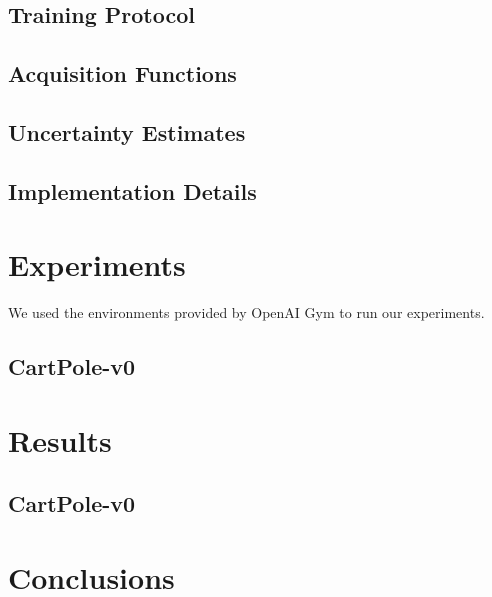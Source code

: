 \documentclass[11pt, a4paper, bibliography=totoc]{report}
\begin{document}
\section{Training Protocol}

\section{Acquisition Functions}

\section{Uncertainty Estimates}

\section{Implementation Details}

\chapter{Experiments}
We used the environments provided by OpenAI Gym to run our experiments.

\section{CartPole-v0}

\chapter{Results}
\section{CartPole-v0}


\chapter{Conclusions}
\end{document}
